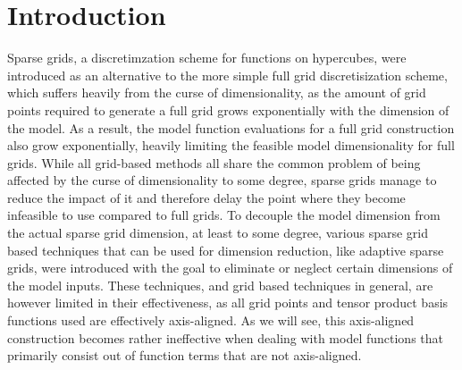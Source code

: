 \documentclass[
  a4paper,  %
  twoside,  %
  bibliography=totoc,
  headsepline,
  cleardoublepage=empty,
  parskip=half,
  draft=false
]{scrbook}
\begin{document}
\renewcommand*{\chapterpagestyle}{scrplain}
\pagestyle{scrheadings}
\pagestyle{scrheadings}
\ihead[]{}
\chead[]{}
\ohead[]{\headmark}
\cfoot[]{}
\ifoot[]{}

































%
%


\chapter{Introduction}
\label{chap:c1}

\setcounter{page}{1}

Sparse grids, a discretimzation scheme for functions on hypercubes, were introduced as an alternative to the more simple full grid discretisization scheme, which suffers heavily from the curse of dimensionality, as the amount of grid points required to generate a full grid grows exponentially with the dimension of the model.
As a result, the model function evaluations for a full grid construction also grow exponentially, heavily limiting the feasible model dimensionality for full grids.
While all grid-based methods all share the common problem of being affected by the curse of dimensionality to some degree, sparse grids manage to reduce the impact of it and therefore delay the point where they become infeasible to use compared to full grids.
To decouple the model dimension from the actual sparse grid dimension, at least to some degree, various sparse grid based techniques that can be used for dimension reduction, like adaptive sparse grids, were introduced with the goal to eliminate or neglect certain  dimensions of the model inputs.
These techniques, and grid based techniques in general, are however limited in their effectiveness, as all grid points and tensor product basis functions used are effectively axis-aligned.
As we will see, this axis-aligned construction becomes rather ineffective when dealing with model functions that primarily consist out of function terms that are not axis-aligned.
\end{document}
